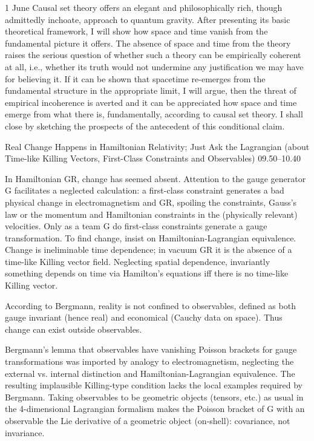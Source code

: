 \documentclass{conference}
\begin{document}
\begin{Day}{1 June}
{Causal set theory offers an elegant and philosophically rich, though admittedly inchoate, approach to quantum gravity. After presenting its basic theoretical framework, I will show how space and time vanish from the fundamental picture it offers. The absence of space and time from the theory raises the serious question of whether such a theory can be empirically coherent at all, i.e., whether its truth would not undermine any justification we may have for believing it. If it can be shown that spacetime re-emerges from the fundamental structure in the appropriate limit, I will argue, then the threat of empirical incoherence is averted and it can be appreciated how space and time emerge from what there is, fundamentally, according to causal set theory. I shall close by sketching the prospects of the antecedent of this conditional claim. }


    {Real Change Happens in Hamiltonian Relativity; Just Ask the Lagrangian (about Time-like Killing Vectors, First-Class Constraints and Observables)}
    {09.50--10.40}
    {In Hamiltonian GR, change has seemed absent.  Attention to the gauge generator G facilitates a neglected calculation:  a first-class constraint generates a bad physical change in electromagnetism and GR, spoiling the constraints, Gauss's law or the momentum and Hamiltonian constraints in the (physically relevant) velocities.  Only as a team G do first-class constraints generate a gauge transformation.  
To find change, insist on Hamiltonian-Lagrangian equivalence.  Change is ineliminable time dependence; in vacuum GR it is the absence of a time-like Killing vector field.  Neglecting spatial dependence, invariantly something depends on time via Hamilton's equations iff there is no time-like Killing vector. 

According to Bergmann, reality is not confined to observables, defined as both gauge invariant (hence real) and economical (Cauchy data on space).  Thus change can exist outside observables.

Bergmann’s lemma that observables have vanishing Poisson brackets for gauge transformations was imported by analogy to electromagnetism, neglecting the external vs. internal distinction and Hamiltonian-Lagrangian equivalence.  The resulting implausible Killing-type condition lacks the local examples required by Bergmann.  Taking observables to be geometric objects (tensors, etc.) as usual in the 4-dimensional Lagrangian formalism makes the Poisson bracket of G with an observable the Lie derivative of a geometric object (on-shell):  covariance, not invariance.}


\end{Day}
\end{document}
